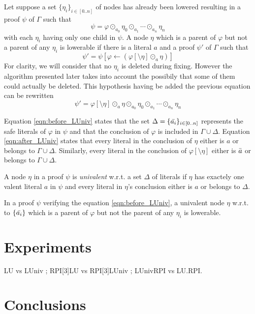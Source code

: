 \documentclass{llncs}
\begin{document}
Let suppose a set $\{\eta_i\}_{i \in [0..n]}$ of nodes has already been lowered resulting in a proof
$\psi$ of $\Gamma$ such that
\begin{equation} \label{eqn:before_LUniv}
  \psi = \varphi \odot_{a_0} \eta_0 \odot_{a_1} \cdots \odot_{a_n} \eta_n
\end{equation}
with each $\eta_i$ having only one child in $\psi$. A node $\eta$ which is a parent of $\varphi$ but
not a parent of any $\eta_i$ is lowerable if there is a literal $a$ and a proof $\psi'$ of
$\Gamma$ such that
\begin{equation}
  \psi' = \psi[\varphi \leftarrow (\varphi[\setminus \eta] \odot_a \eta)]
\end{equation}
For clarity, we will consider that no $\eta_i$ is deleted during fixing. However the algorithm
presented later takes into account the possibily that some of them could actually be deleted. This
hypothesis having be added the previous equation can be rewritten
\begin{equation} \label{eqn:after_LUniv}
  \psi' = \varphi[\setminus \eta] \odot_a \eta \odot_{a_0} \eta_0 \odot_{a_1} \cdots \odot_{a_n} \eta_n
\end{equation}

Equation \ref{eqn:before_LUniv} states that the set $\Delta = \{\bar{a_i}\}_{i \in [0..n]}$
represents the safe literals of $\varphi$ in $\psi$ and that the conclusion of $\varphi$ is included
in $\Gamma \cup \Delta$. Equation \ref{eqn:after_LUniv} states that every literal in the conclusion
of $\eta$ either is $a$ or belongs to $\Gamma \cup \Delta$. Similarly, every literal in the
conclusion of $\varphi[\setminus \eta]$ either is $\bar{a}$ or belongs to $\Gamma \cup \Delta$.

\begin{definition}
A node $\eta$ in a proof $\psi$ is \emph{univalent} w.r.t. a set $\Delta$ of literals if $\eta$ has
exactely one valent literal $a$ in $\psi$ and every literal in $\eta$'s conclusion either is $a$ or
belongs to $\Delta$.
\end{definition}

In a proof $\psi$ verifying the equation \ref{eqn:before_LUniv}, a univalent node $\eta$ w.r.t. to
$\{\bar{a_i}\}$ which is a parent of $\varphi$ but not the parent of any $\eta_i$ is lowerable.


\section{Experiments}



\begin{jb}
LU vs LUniv ; RPI[3]LU vs RPI[3]LUniv ; LUnivRPI vs LU.RPI.
\end{jb}

\section{Conclusions}



\end{document}
